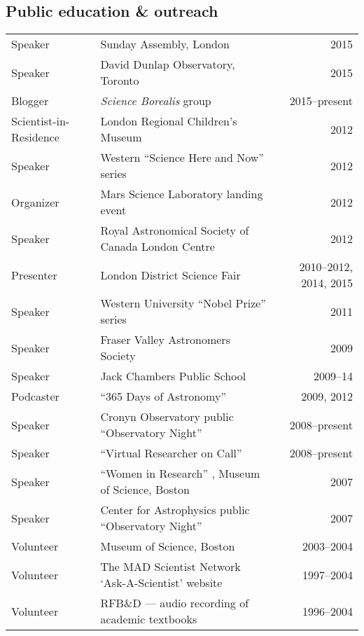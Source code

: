 \documentclass[12pt]{article}
\begin{document}
\subsection{Public education \& outreach}
\begin{tabularx}{\textwidth}{lXr}
Speaker & Sunday Assembly, London  & 2015\\
Speaker & David Dunlap Observatory, Toronto& 2015\\
Blogger & {\it Science Borealis} group & 2015--present\\
Scientist-in-Residence& London Regional Children's Museum& 2012\\
Speaker& Western ``Science Here and Now'' series& 2012\\
Organizer& Mars Science Laboratory landing event& 2012\\
Speaker& Royal Astronomical Society of Canada London Centre& 2012\\
Presenter& London District Science Fair& 2010--2012, 2014, 2015\\
Speaker& Western University ``Nobel Prize'' series& 2011\\
Speaker& Fraser Valley Astronomers Society& 2009\\
Speaker& Jack Chambers Public School& 2009--14\\
Podcaster &  ``365 Days of Astronomy''  &2009, 2012\\
Speaker& Cronyn Observatory public ``Observatory Night'' & 2008--present\\
Speaker& ``Virtual Researcher on Call'' & 2008--present\\
Speaker & ``Women in Research'' , Museum of Science, Boston& 2007\\
Speaker& Center for Astrophysics public ``Observatory Night'' & 2007\\
Volunteer& Museum of Science, Boston& 2003--2004\\
Volunteer& The MAD Scientist Network `Ask-A-Scientist' website& 1997--2004\\
Volunteer& RFB\&D --- audio recording of academic textbooks& 1996--2004\\
\end{tabularx}
\end{document}
